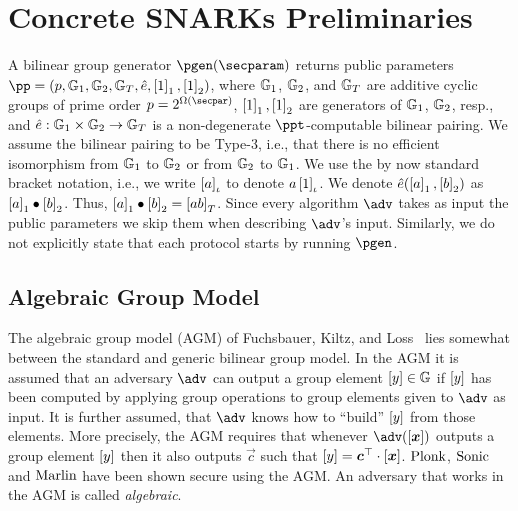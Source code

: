 \section{Concrete SNARKs Preliminaries}

A bilinear group generator $\pgen (\secparam)$ returns public parameters $ \pp =
(p, \GRP_1, \GRP_2, \GRP_T, \pair, \gone{1}, \gtwo{1})$, where $\mathbb{G}_1$,
$\mathbb{G}_2$, and $\mathbb{G}_T$ are additive cyclic groups of prime order $p = 2^{\Omega
  (\secpar)}$, $\left[1\right]_{1}, \left[1\right]_{2}$ are generators of $\mathbb{G}_1$, $\mathbb{G}_2$, resp.,
and $\hat{e}: \mathbb{G}_1 \times \mathbb{G}_2 \to \mathbb{G}_T$ is a non-degenerate
$\ppt$-computable bilinear pairing. We assume the bilinear pairing to be Type-3,
i.e., that there is no efficient isomorphism from $\mathbb{G}_1$ to $\mathbb{G}_2$ or from
$\mathbb{G}_2$ to $\mathbb{G}_1$. We use the by now standard bracket notation, i.e., we
write $\left[a\right]_{\iota}$ to denote $a \left[1\right]_{\iota}$. %
We denote $\hat{e} (\left[a\right]_{1}, \left[b\right]_{2})$ as $\left[a\right]_{1} \bullet
\left[b\right]_{2}$. Thus, $\left[a\right]_{1} \bullet \left[b\right]_{2} = \left[a b\right]_{T}$. 
Since every algorithm $\adv$ takes as input
the public parameters we skip them when describing $\adv$'s input. Similarly, we
do not explicitly state that each protocol starts by running $\pgen$.

\subsection{Algebraic Group Model}
The algebraic group model (AGM) of Fuchsbauer, Kiltz, and Loss~\cite{C:FucKilLos18} lies somewhat between the
standard and generic bilinear group model. In the AGM it is assumed that an
adversary $\adv$ can output a group element $\left[y\right] \in \mathbb{G}$ if $\left[y\right]$ has
been computed by applying group operations to group elements given to $\adv$ as
input. It is further assumed, that $\adv$ knows how to ``build'' $\left[y\right]$ from
those elements. More precisely, the AGM requires that whenever $\adv(\gnone{\vec{x}})$
outputs a group element $\left[y\right]$ then it also outputs $\vec{c}$ such that
$\gnone{y} = \vec{c}^\top \cdot \gnone{\vec{x}}$. $\textnormal{{Plonk}}$, ${\textnormal{{Sonic}}}$ and ${\textnormal{{Marlin}}}$
have been shown secure using the AGM. An adversary that works in the AGM is called
\emph{algebraic}.

